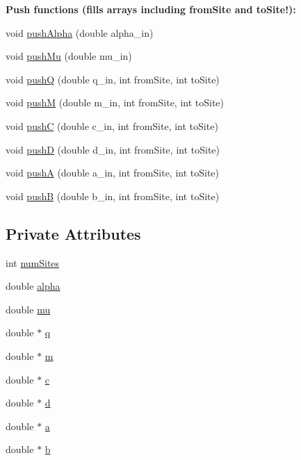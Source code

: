 \begin{Indent}{\bf Push functions (fills arrays including from\+Site and to\+Site!)\+:}\par
\begin{DoxyCompactItemize}
\item 
void \hyperlink{class_p_c_a_1_1_hamiltonian_aa1acb10e2078e74b747892db50a0342c}{push\+Alpha} (double alpha\+\_\+in)
\item 
void \hyperlink{class_p_c_a_1_1_hamiltonian_a98a0769af6bbaae97843e821b9b516a1}{push\+Mu} (double mu\+\_\+in)
\item 
void \hyperlink{class_p_c_a_1_1_hamiltonian_acc90d71bea33d377b93db657f4444d93}{pushQ} (double q\+\_\+in, int from\+Site, int to\+Site)
\item 
void \hyperlink{class_p_c_a_1_1_hamiltonian_a65c8f6848095abff386aa04a916b0c81}{pushM} (double m\+\_\+in, int from\+Site, int to\+Site)
\item 
void \hyperlink{class_p_c_a_1_1_hamiltonian_a9ca9ef677e2fedc8d82faca80e216e17}{pushC} (double c\+\_\+in, int from\+Site, int to\+Site)
\item 
void \hyperlink{class_p_c_a_1_1_hamiltonian_a8f0f25f18c67f7943714d086737e427f}{pushD} (double d\+\_\+in, int from\+Site, int to\+Site)
\item 
void \hyperlink{class_p_c_a_1_1_hamiltonian_aacf57a40855dbf2e27f598b0af2fcba3}{pushA} (double a\+\_\+in, int from\+Site, int to\+Site)
\item 
void \hyperlink{class_p_c_a_1_1_hamiltonian_a5390261dba56862d9ce18d0102f81ce1}{pushB} (double b\+\_\+in, int from\+Site, int to\+Site)
\end{DoxyCompactItemize}
\end{Indent}
\subsection*{Private Attributes}
\begin{DoxyCompactItemize}
\item 
int \hyperlink{class_p_c_a_1_1_hamiltonian_ad974eb16fba08e8e07cd60756fd223fb}{num\+Sites}
\item 
double \hyperlink{class_p_c_a_1_1_hamiltonian_a71a66a52512faafc9bc8594d96f02e5f}{alpha}
\item 
double \hyperlink{class_p_c_a_1_1_hamiltonian_afe68ce905e666835d5f1042c15be14bc}{mu}
\item 
double $\ast$ \hyperlink{class_p_c_a_1_1_hamiltonian_a2ff873d072df1447deb904d615fe9f02}{q}
\item 
double $\ast$ \hyperlink{class_p_c_a_1_1_hamiltonian_a6f5a67ef0c252c98edf24637179dbbc7}{m}
\item 
double $\ast$ \hyperlink{class_p_c_a_1_1_hamiltonian_ada70e13b8ae935e2109179d50fcfaa2f}{c}
\item 
double $\ast$ \hyperlink{class_p_c_a_1_1_hamiltonian_a61b0c483fb1966a22eaed55cca41950d}{d}
\item 
double $\ast$ \hyperlink{class_p_c_a_1_1_hamiltonian_aec8578a7d250be77a3e2eb84718815c7}{a}
\item 
double $\ast$ \hyperlink{class_p_c_a_1_1_hamiltonian_ac3a46f259db252d1b3a4ddbf40422026}{b}
\end{DoxyCompactItemize}


